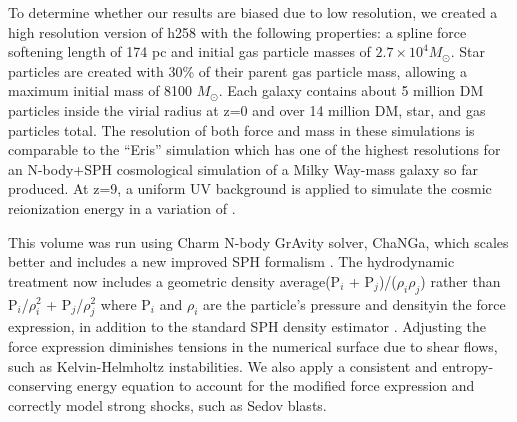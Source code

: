 \documentclass[12pt,headA,chapB]{fiskthesis}
\begin{document}
To determine whether our results are biased due to low resolution, we created a high resolution version of h258 with the following properties: a spline force softening length of 174 pc and initial gas particle masses of $2.7 \times 10^4 M_{\odot}$. Star particles are created with 30\% of their parent gas particle mass, allowing a maximum initial mass of 8100 $M_{\odot}$. Each galaxy contains about 5 million DM particles inside the virial radius at z=0 and over 14 million DM, star, and gas particles total. The resolution of both force and mass in these simulations is comparable to the ``Eris'' simulation which has one of the highest resolutions for an N-body+SPH cosmological simulation of a Milky Way-mass galaxy so far produced.  At z=9, a uniform UV background is applied to simulate the cosmic reionization energy in a variation of \cite{Haardt2012}.

This volume was run using Charm N-body GrAvity solver, ChaNGa, which scales better and includes a new improved SPH formalism \citep{Keller2014}. The hydrodynamic treatment now includes a geometric density average\textemdash (P$_i$ + P$_j$)/($\rho_i \rho_j$) rather than P$_i$/$\rho_{i}^2$ + P$_j$/$\rho_{j}^2$ where P$_i$ and $\rho_i$ are the particle's pressure and density\textemdash in the force expression, in addition to the standard SPH density estimator \citep{Ritchie2001}. Adjusting the force expression diminishes tensions in the numerical surface due to shear flows, such as Kelvin-Helmholtz instabilities. We also apply a consistent and entropy-conserving energy equation to account for the modified force expression and correctly model strong shocks, such as Sedov blasts. 

\end{document}
